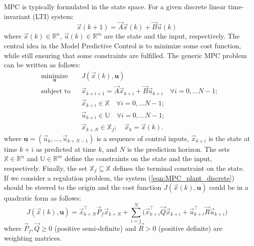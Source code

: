 MPC is typically formulated in the state space. For a given discrete linear time-invariant (LTI) system:
\begin{equation}
\label{eqn:MPC_plant_discrete}
\vec{x}(k+1)=\vec{A}\vec{x}(k)+ \vec{B} \vec{u}(k)
\end{equation}
where $\vec{x}(k)\in\mathbb{R}^n$, $\vec{u}(k)\in\mathbb{R}^m$ are the state and the input, respectively. The central idea in the Model Predictive Control is to minimize some cost function, while still ensuring that some constraints are fulfilled. The generic MPC problem can be written as follows:
\begin{equation}
\label{eqn:MPC_optimization}
\begin{aligned}
& \underset{\textbf{u}}{\text{minimize}}
& & J(\vec{x}(k), \textbf{u}) \\
& \text{subject to}
& & \vec{x}_{k+i+1} = \vec{A}\vec{x}_{k+i}+ \vec{B} \vec{u}_{k+i}\quad\forall i=0,\dots N-1;\\
& & & \vec{x}_{k+i}\in \mathbb{X}\quad\forall i=0,\dots N-1;\\
& & & \vec{u}_{k+i}\in \mathbb{U}\quad\forall i=0,\dots N-1;\\  
& & & \vec{x}_{k+N}\in \mathbb{X}_f;\quad\vec{x}_k = \vec{x}(k).
\end{aligned}
\end{equation}
where $\textbf{u}=(\vec{u}_k,\dots,\vec{u}_{k+N-1})$ is a sequence of control inputs, $\vec{x}_{k+i}$ is the state at time $k+i$ as predicted at time $k$, and $N$ is the prediction horizon. The sets $\mathbb{X}\in\mathbb{R}^n$ and $\mathbb{U}\in\mathbb{R}^m$ define the constraints on the state and the input, respectively. Finally, the set $\mathbb{X}_f\subseteq\mathbb{X}$ defines the terminal constraint on the state. If we consider a regulation problem, the system (\ref{eqn:MPC_plant_discrete}) should be steered to the origin and the cost function $J(\vec{x}(k), \textbf{u})$ could be in a quadratic form as follows:
\begin{equation}
\label{eqn:MPC_cost_function_regulation}
	J(\vec{x}(k), \textbf{u}) = \vec{x}^\intercal_{k+N}\vec{P}_f\vec{x}_{k+N}+\sum_{i=1}^{N}\Big(\vec{x}^\intercal_{k+i}\vec{Q}\vec{x}_{k+i}+\vec{u}_{k+i}^\intercal\vec{R}\vec{u}_{k+i}\Big)
\end{equation}
where $\vec{P}_f,\vec{Q}\geq0$ (positive semi-definite) and $\vec{R}>0$ (positive definite) are weighting matrices.

